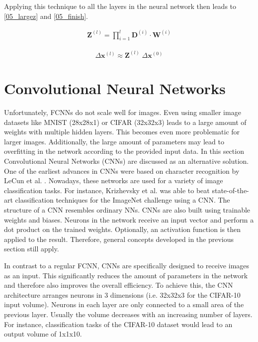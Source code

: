 \begingroup
Applying this technique to all the layers in the neural network then leads to \ref{05_largez}
and \ref{05_finish}.
\endgroup

\begin{equation}
\label{05_largez}
\begin{aligned}
  \bm{Z}^{(l)} = \prod_{i=1}^{l} \bm{D}^{(i)} \cdot \bm{W}^{(i)}
\end{aligned}
\end{equation}

\begin{equation}
\label{05_finish}
\begin{aligned}
  \Delta \bm{x}^{(l)} \approx \bm{Z}^{(l)} \; \Delta \bm{x}^{(0)}
\end{aligned}
\end{equation}

\section{Convolutional Neural Networks}\label{sec:section}

\begingroup
Unfortunately, FCNNs do not scale well for images. Even using smaller image datasets like MNIST (28x28x1) or CIFAR (32x32x3)
leads to a large amount of weights with multiple hidden layers. This becomes even more problematic for larger images.
Additionally, the large amount of parameters may lead to overfitting in the network according to the provided input data.
In this section Convolutional Neural Networks (CNNs) are discussed as an alternative solution.
One of the earliest advances in CNNs were based on character recognition by LeCun et al. \cite{LeCun}. Nowadays, these networks
are used for a variety of image classification tasks. For instance, Krizhevsky et al. \cite{AlexNet} was able to beat
state-of-the-art classification techniques for the ImageNet challenge using a CNN. The structure of a CNN resembles ordinary
NNs. CNNs are also built using trainable weights and biases. Neurons in the network receive an input vector
and perform a dot product on the trained weights. Optionally, an activation function is then applied to the result.
Therefore, general concepts developed in the previous section still apply.

In contrast to a regular FCNN, CNNs are specifically designed to receive images as an input.
This significantly reduces the amount of parameters in the network and therefore also improves the overall efficiency.
To achieve this, the CNN architecture arranges neurons in 3 dimensions (i.e. 32x32x3 for the CIFAR-10 input volume).
Neurons in each layer are only connected to a small area of the previous layer. Usually the volume decreases with an
increasing number of layers. For instance, classification tasks of the CIFAR-10 dataset would lead to an output volume of
1x1x10.

